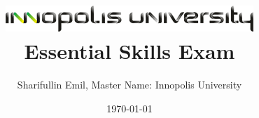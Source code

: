 \documentclass[twocolumn]{report}
\begin{document}
\graphicspath{ {./images/} }

\title{\includegraphics{logo}\\Essential Skills Exam}
\author{Sharifullin Emil, Master Name: Innopolis University}
\date{\today}

\maketitle
\tableofcontents
\listoffigures
\listoftables
\newpage






\end{document}
